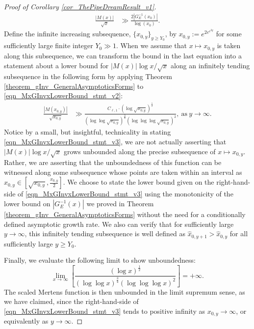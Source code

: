 \documentclass[11pt,reqno,a4letter]{article}
\numberwithin{figure}{section}
\numberwithin{table}{section}
\theoremstyle{plain}
\numberwithin{theorem}{section}
\theoremstyle{definition}
\begin{document}
\begin{proof}[Proof of Corollary \ref{cor_ThePipeDreamResult_v1}]
\begin{align}
\frac{|M(x)|}{\sqrt{x}} & \gg \frac{2 \left\lvert G_{E}^{-1}(x_0) \right\rvert}{\log\left(x_0\right)}. 
\end{align} 
Define the infinite increasing subsequence, 
$\{x_{0,y}\}_{y \geq Y_0}$, by $x_{0,y} := e^{2e^{e^{2y}}}$ for some sufficiently 
large finite integer $Y_0 \gg 1$. 
When we assume that $x \mapsto x_{0,y}$ is taken along this subsequence, 
we can transform the bound in the last 
equation into a statement about a lower bound for $|M(x)| \log x / \sqrt{x}$ 
along an infinitely tending subsequence in the following form by 
applying Theorem \ref{theorem_gInv_GeneralAsymptoticsForms} to 
\eqref{eqn_MxGInvxLowerBound_stmt_v2}: 
\begin{align} 
\label{eqn_MxGInvxLowerBound_stmt_v3} 
\frac{|M(x_{0,y})|}{\sqrt{x_{0,y}}} & \gg 
     \frac{C_{\ell,1} \cdot (\log \sqrt{x_{0,y}})^{\frac{1}{2}}}{ 
     (\log\log \sqrt{x_{0,y}})^{\frac{3}{4}} (\log\log\log \sqrt{x_{0,y}})^2}, 
     \mathrm{\ as\ } y \rightarrow \infty. 
\end{align} 
Notice by a small, but insightful, 
technicality in stating \eqref{eqn_MxGInvxLowerBound_stmt_v3}, 
we are not actually asserting that 
$|M(x)| \log x / \sqrt{x}$ grows unbounded along the precise subsequence of 
$x \mapsto x_{0,y}$. Rather, we are asserting that the unboundedness of this function 
can be witnessed along some subsequence whose points are taken within an interval as 
$\hat{x}_{0,y} \in \left[\sqrt{x_{0,y}}, \frac{x_{0,y}}{2}\right]$. 
We choose to state the lower bound given on the right-hand-side of 
\eqref{eqn_MxGInvxLowerBound_stmt_v3} using the 
monotonicity of the lower bound on $|G_E^{-1}(x)|$ we proved in 
Theorem \ref{theorem_gInv_GeneralAsymptoticsForms} without the need for a conditionally 
defined asymptotic growth rate. 
We also can verify that for sufficiently large $y \rightarrow \infty$, this infinitely 
tending subsequence is well defined as $\hat{x}_{0,y+1} > \hat{x}_{0,y}$ for all 
sufficiently large $y \geq Y_0$. 

Finally, we evaluate the following limit to show unboundedness: 
\[
\lim_{x \rightarrow \infty} \left[\frac{(\log x)^{\frac{1}{2}}}{ 
     (\log\log x)^{\frac{3}{4}} (\log\log\log x)^2}  
     \right] = +\infty. 
\]
The scaled Mertens function is then 
unbounded in the limit supremum sense, as we have claimed, since the right-hand-side of 
\eqref{eqn_MxGInvxLowerBound_stmt_v3} tends to positive infinity as 
$x_{0,y} \rightarrow \infty$, or equivalently as $y \rightarrow \infty$. 
\end{proof} 
\end{document}
